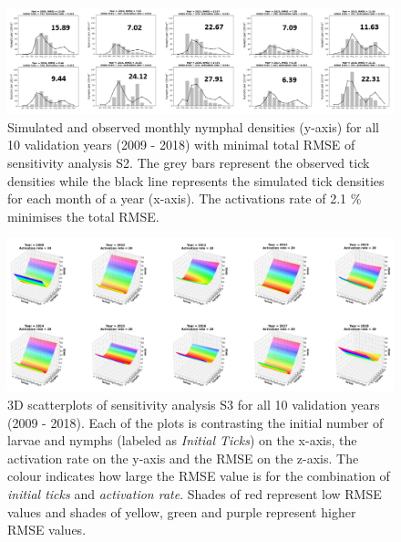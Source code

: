 \documentclass[a4paper, 11pt]{scrartcl}
\begin{document}
\begin{figure}
\centering
\includegraphics[width=\linewidth]{figures/initial_ticks_without_beech.png}
\caption{Simulated and observed monthly nymphal densities (y-axis) for all 10 validation years (2009 - 2018) with minimal total RMSE of sensitivity analysis S2. The grey bars
represent the observed tick densities while the black line represents the simulated tick densities for each month of a year (x-axis). The activations rate of 2.1 \% minimises
the total RMSE.}
\label{fig:initial_ticks_without_beech_rotated}
\end{figure}

\begin{figure}
\centering
\includegraphics[width=\linewidth]{figures/independent_initial_ticks_with_beech_error.png}
\caption{3D scatterplots of sensitivity analysis S3 for all 10 validation years (2009 - 2018). Each of the plots is contrasting the initial number of larvae and nymphs
(labeled as \textit{Initial Ticks}) on the x-axis, the activation rate on the y-axis and the RMSE on the z-axis. The colour indicates how large the RMSE value is for the
combination of \textit{initial ticks} and \textit{activation rate}. Shades of red represent low RMSE values and shades of yellow, green and purple represent higher RMSE values.}
\label{fig:independent_initial_ticks_with_beech_error_rotated}
\end{figure}
\end{document}
